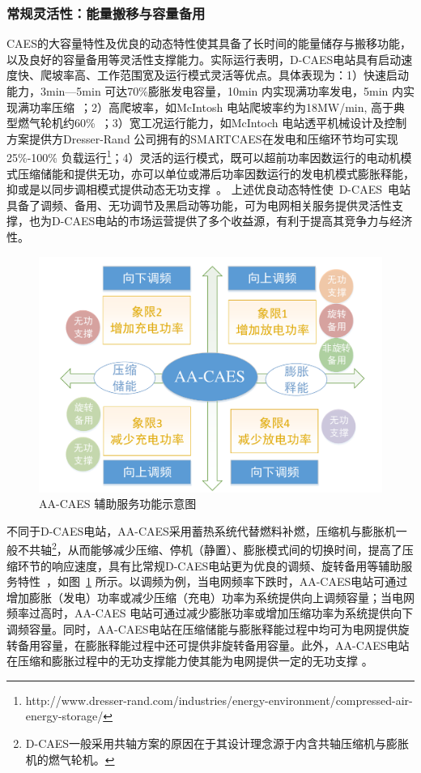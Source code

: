 \subsubsection{常规灵活性：能量搬移与容量备用}
CAES的大容量特性及优良的动态特性使其具备了长时间的能量储存与搬移功能，以及良好的容量备用等灵活性支撑能力。实际运行表明，D-CAES电站具有启动速度快、爬坡率高、工作范围宽及运行模式灵活等优点\cite{CAES-Review-18-Rui-operation}。具体表现为：1）快速启动能力，3min—5min 可达70\%膨胀发电容量，10min 内实现满功率发电，5min 内实现满功率压缩~\cite{Huntorf-20-01}；2）高爬坡率，如McIntosh 电站爬坡率约为18MW/min, 高于典型燃气轮机约60\%~\cite{CAES-Alabama-06}；3）宽工况运行能力，如McIntoch 电站透平机械设计及控制方案提供方Dresser-Rand 公司拥有的SMARTCAES在发电和压缩环节均可实现25\%-100\% 负载运行\footnote{http://www.dresser-rand.com/industries/energy-environment/compressed-air-energy-storage/}；4）灵活的运行模式，既可以超前功率因数运行的电动机模式压缩储能和提供无功，亦可以单位或滞后功率因数运行的发电机模式膨胀释能，抑或是以同步调相模式提供动态无功支撑~\cite{CAES-Reactive-13,CAES-Reactive-18-LGK}。 上述优良动态特性使~D-CAES~电站具备了调频、备用、无功调节及黑启动等功能，可为电网相关服务提供灵活性支撑，也为D-CAES电站的市场运营提供了多个收益源，有利于提高其竞争力与经济性。

\begin{figure}[htp] %
  \centering
  \includegraphics[scale=0.60]{figures/Chap1-2-CAES-AS-Overview-2.pdf}
  \caption{AA-CAES 辅助服务功能示意图}
  \label{fig:CAES-AS-Overview}
\end{figure}

不同于D-CAES电站，AA-CAES采用蓄热系统代替燃料补燃，压缩机与膨胀机一般不共轴\footnote{D-CAES一般采用共轴方案的原因在于其设计理念源于内含共轴压缩机与膨胀机的燃气轮机。}，从而能够减少压缩、停机（静置）、膨胀模式间的切换时间，提高了压缩环节的响应速度，具有比常规D-CAES电站更为优良的调频、旋转备用等辅助服务特性~\cite{ESS-Model-14}，如图~\ref{fig:CAES-AS-Overview} 所示。以调频为例，当电网频率下跌时，AA-CAES电站可通过增加膨胀（发电）功率或减少压缩（充电）功率为系统提供向上调频容量；当电网频率过高时，AA-CAES 电站可通过减少膨胀功率或增加压缩功率为系统提供向下调频容量。同时，AA-CAES电站在压缩储能与膨胀释能过程中均可为电网提供旋转备用容量，在膨胀释能过程中还可提供非旋转备用容量。此外，AA-CAES电站在压缩和膨胀过程中的无功支撑能力使其能为电网提供一定的无功支撑 \cite{CAES-Reactive-18-LGK}。

